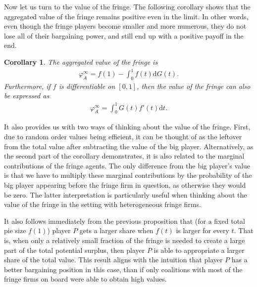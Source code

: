 \documentclass[a4paper]{article}
\newtheorem{corollary}{Corollary}
\newcommand{\dt}{\mathrm{d}t}
\newcommand{\dG}{\mathrm{d}G}
\begin{document}

Now let us turn to the value of the fringe.
The following corollary shows that the aggregated value of the fringe remains positive even in the limit.
In other words, even though the fringe players become smaller and more numerous, they do not lose all of their bargaining power, and still end up with a positive payoff in the end.
\begin{corollary}
    \label{cor:fringe_value_general}
    The aggregated value of the fringe is
    \begin{align*}
        \varphi_A^\infty = f(1) - \int_0^1 f(t) \dG(t).
    \end{align*}
    Furthermore, if $f$ is differentiable on $[0, 1]$, then the value of the fringe can also be expressed as
    \begin{align*}
        \varphi_A^\infty = \int_0^1 G(t) f'(t) \dt.
    \end{align*}
\end{corollary}

It also provides us with two ways of thinking about the value of the fringe.
First, due to random order values being efficient, it can be thought of as the leftover from the total value after subtracting the value of the big player.
Alternatively, as the second part of the corollary demonstrates, it is also related to the marginal contributions of the fringe agents.
The only difference from the big player's value is that we have to multiply these marginal contributions by the probability of the big player appearing before the fringe firm in question, as otherwise they would be zero.
The latter interpretation is particularly useful when thinking about the value of the fringe in the setting with heterogeneous fringe firms.

It also follows immediately from the previous proposition that (for a fixed total pie size $f(1)$) player $P$ gets a larger share when $f(t)$ is larger for every $t$.
That is, when only a relatively small fraction of the fringe is needed to create a large part of the total potential surplus, then player $P$ is able to appropriate a larger share of the total value.
This result aligns with the intuition that player $P$ has a better bargaining position in this case, than if only coalitions with most of the fringe firms on board were able to obtain high values.

\end{document}
